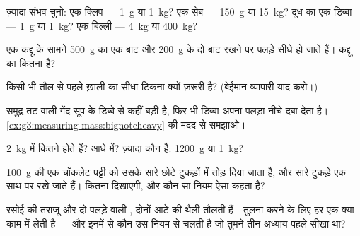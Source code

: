 \begin{exercise}[$\star$]\label{exo:g3:measuring-mass:2}
ज़्यादा संभव  चुनो: एक क्लिप --- \qty{1}{g} या
\qty{1}{kg}? एक सेब --- \qty{150}{g} या \qty{15}{kg}? दूध का एक
डिब्बा --- \qty{1}{g} या \qty{1}{kg}? एक बिल्ली --- \qty{4}{kg} या
\qty{400}{kg}?
\end{exercise}

\begin{exercise}[$\star$]\label{exo:g3:measuring-mass:3}
एक कद्दू के सामने \qty{500}{g} का एक बाट और \qty{200}{g} के दो बाट
रखने पर पलड़े सीधे हो जाते हैं। कद्दू का  कितना है?
\end{exercise}

\begin{exercise}[$\star$]\label{exo:g3:measuring-mass:4}
किसी भी तौल से पहले ख़ाली  का सीधा टिकना क्यों ज़रूरी है?
(बेईमान व्यापारी याद करो।)
\end{exercise}

\begin{exercise}[$\star$]\label{exo:g3:measuring-mass:5}
समुद्र-तट वाली गेंद सूप के डिब्बे से कहीं बड़ी है, फिर भी डिब्बा
अपना पलड़ा नीचे दबा देता है।
\cref{ex:g3:measuring-mass:bignotcheavy} की मदद से समझाओ।
\end{exercise}

\begin{exercise}[$\star$]\label{exo:g3:measuring-mass:6}
\qty{2}{kg} में कितने  होते हैं? आधे  में? ज़्यादा
कौन है: \qty{1200}{g} या \qty{1}{kg}?
\end{exercise}

\begin{exercise}[$\star$]\label{exo:g3:measuring-mass:7}
\qty{100}{g} की एक चॉकलेट पट्टी को उसके सारे छोटे टुकड़ों में तोड़
दिया जाता है, और सारे टुकड़े एक साथ  पर रखे जाते हैं। 
कितना  दिखाएगी, और कौन-सा नियम ऐसा कहता है?
\end{exercise}

\begin{exercise}[$\star$]\label{exo:g3:measuring-mass:8}
रसोई की तराज़ू और दो-पलड़े वाली , दोनों आटे की थैली तौलती हैं।
तुलना करने के लिए हर एक क्या काम में लेती है --- और इनमें से कौन उस
नियम से चलती है जो तुमने तीन अध्याय पहले सीखा था?
\end{exercise}

